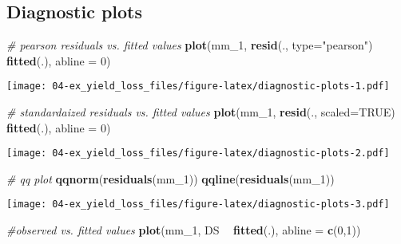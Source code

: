 \documentclass[]{book}
\newenvironment{Shaded}{\begin{snugshade}}{\end{snugshade}}
\newcommand{\CommentTok}[1]{\textcolor[rgb]{0.56,0.35,0.01}{\textit{#1}}}
\newcommand{\DataTypeTok}[1]{\textcolor[rgb]{0.13,0.29,0.53}{#1}}
\newcommand{\DecValTok}[1]{\textcolor[rgb]{0.00,0.00,0.81}{#1}}
\newcommand{\KeywordTok}[1]{\textcolor[rgb]{0.13,0.29,0.53}{\textbf{#1}}}
\newcommand{\NormalTok}[1]{#1}
\newcommand{\OperatorTok}[1]{\textcolor[rgb]{0.81,0.36,0.00}{\textbf{#1}}}
\newcommand{\OtherTok}[1]{\textcolor[rgb]{0.56,0.35,0.01}{#1}}
\newcommand{\StringTok}[1]{\textcolor[rgb]{0.31,0.60,0.02}{#1}}
\begin{document}
\hypertarget{diagnostic-plots-1}{%
\subsection{Diagnostic plots}\label{diagnostic-plots-1}}

\begin{Shaded}
\begin{Highlighting}[]
\CommentTok{# pearson residuals vs. fitted values}
\KeywordTok{plot}\NormalTok{(mm_}\DecValTok{1}\NormalTok{, }\KeywordTok{resid}\NormalTok{(., }\DataTypeTok{type=}\StringTok{"pearson"}\NormalTok{) }\OperatorTok{~}\StringTok{ }\KeywordTok{fitted}\NormalTok{(.), }\DataTypeTok{abline =} \DecValTok{0}\NormalTok{)}
\end{Highlighting}
\end{Shaded}

\texttt{[image: 04-ex\_yield\_loss\_files/figure-latex/diagnostic-plots-1.pdf]}

\begin{Shaded}
\begin{Highlighting}[]
\CommentTok{# standardaized residuals vs. fitted values}
\KeywordTok{plot}\NormalTok{(mm_}\DecValTok{1}\NormalTok{, }\KeywordTok{resid}\NormalTok{(., }\DataTypeTok{scaled=}\OtherTok{TRUE}\NormalTok{) }\OperatorTok{~}\StringTok{ }\KeywordTok{fitted}\NormalTok{(.), }\DataTypeTok{abline =} \DecValTok{0}\NormalTok{)}
\end{Highlighting}
\end{Shaded}

\texttt{[image: 04-ex\_yield\_loss\_files/figure-latex/diagnostic-plots-2.pdf]}

\begin{Shaded}
\begin{Highlighting}[]
\CommentTok{# qq plot}
\KeywordTok{qqnorm}\NormalTok{(}\KeywordTok{residuals}\NormalTok{(mm_}\DecValTok{1}\NormalTok{))}
\KeywordTok{qqline}\NormalTok{(}\KeywordTok{residuals}\NormalTok{(mm_}\DecValTok{1}\NormalTok{))}
\end{Highlighting}
\end{Shaded}

\texttt{[image: 04-ex\_yield\_loss\_files/figure-latex/diagnostic-plots-3.pdf]}

\begin{Shaded}
\begin{Highlighting}[]
\CommentTok{#observed vs. fitted values}
\KeywordTok{plot}\NormalTok{(mm_}\DecValTok{1}\NormalTok{, DS }\OperatorTok{~}\StringTok{ }\KeywordTok{fitted}\NormalTok{(.), }\DataTypeTok{abline =} \KeywordTok{c}\NormalTok{(}\DecValTok{0}\NormalTok{,}\DecValTok{1}\NormalTok{))}
\end{Highlighting}
\end{Shaded}
\end{document}
